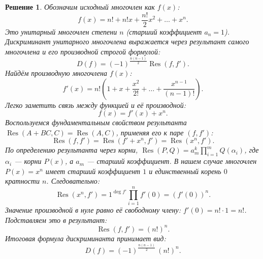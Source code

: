 \documentclass[14pt]{article}
\newtheorem*{solution}{Решение}
\begin{document}
	\begin{solution}
		Обозначим исходный многочлен как $f(x)$:
		\[
		f(x) = n! + n!x + \frac{n!}{2}x^2 + \dots + x^n.
		\]
		Это унитарный многочлен степени $n$ (старший коэффициент $a_n = 1$). Дискриминант унитарного многочлена выражается через результант самого многочлена и его производной строгой формулой:
		\[
		D(f) = (-1)^{\frac{n(n-1)}2} \operatorname{Res}(f, f').
		\]
		Найдём производную многочлена $f(x)$:
		\[
		f'(x) = n!\left(1 + x + \frac{x^2}{2!} + \dots + \frac{x^{n-1}}{(n-1)!}\right).
		\]
		Легко заметить связь между функцией и её производной:
		\[
		f(x) = f'(x) + x^n.
		\]
		Воспользуемся фундаментальным свойством результанта $\operatorname{Res}(A + BC, C) = \operatorname{Res}(A, C)$, применяя его к паре $(f, f')$:
		\[
		\operatorname{Res}(f, f') = \operatorname{Res}(f' + x^n, f') = \operatorname{Res}(x^n, f').
		\]
		По определению результанта через корни, $\operatorname{Res}(P, Q) = a_m^k \prod_{i=1}^m Q(\alpha_i)$, где $\alpha_i$ — корни $P(x)$, а $a_m$ — старший коэффициент. В нашем случае многочлен $P(x) = x^n$ имеет старший коэффициент $1$ и единственный корень $0$ кратности $n$. Следовательно:
		\[
		\operatorname{Res}(x^n, f') = 1^{\deg f'} \prod_{i=1}^n f'(0) = (f'(0))^n.
		\]
		Значение производной в нуле равно её свободному члену: $f'(0) = n! \cdot 1 = n!$. Подставляем это в результант:
		\[
		\operatorname{Res}(f, f') = (n!)^n.
		\]
		Итоговая формула дискриминанта принимает вид:
		\[
		D(f) = (-1)^{\frac{n(n-1)}2}\, (n!)^n.
		\]
	\end{solution}
	
\end{document}
